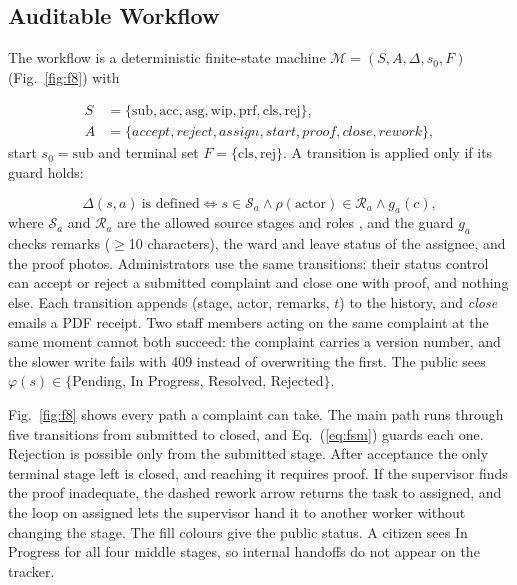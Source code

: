 \documentclass{ieeeaccess}
\begin{document}
\subsection{Auditable Workflow}\label{sec:wf}

The workflow is a deterministic finite-state machine $\mathcal{M}=(S,A,\Delta,s_0,F)$ (Fig.~\ref{fig:f8}) with

\begin{align*}
S&=\{\mathrm{sub},\mathrm{acc},\mathrm{asg},\mathrm{wip},\mathrm{prf},\mathrm{cls},\mathrm{rej}\},\\
A&=\{\mathit{accept},\mathit{reject},\mathit{assign},\mathit{start},\mathit{proof},\mathit{close},\mathit{rework}\},
\end{align*}
\noindent start $s_0=\mathrm{sub}$ and terminal set $F=\{\mathrm{cls},\mathrm{rej}\}$. A transition is applied only if its guard holds:

\begin{equation}
\Delta(s,a)\ \text{is defined} \iff s\in\mathcal{S}_a \wedge \rho(\text{actor})\in\mathcal{R}_a \wedge g_a(c),
\label{eq:fsm}
\end{equation}
\noindent where $\mathcal{S}_a$ and $\mathcal{R}_a$ are the allowed source stages and roles \cite{b49}, and the guard $g_a$ checks remarks ($\ge$10 characters), the ward and leave status of the assignee, and the proof photos. Administrators use the same transitions: their status control can accept or reject a submitted complaint and close one with proof, and nothing else. Each transition appends (stage, actor, remarks, $t$) to the history, and \textit{close} emails a PDF receipt. Two staff members acting on the same complaint at the same moment cannot both succeed: the complaint carries a version number, and the slower write fails with 409 instead of overwriting the first. The public sees $\varphi(s)\in\{$Pending, In Progress, Resolved, Rejected$\}$.

Fig.~\ref{fig:f8} shows every path a complaint can take. The main path runs through five transitions from submitted to closed, and Eq.~(\ref{eq:fsm}) guards each one. Rejection is possible only from the submitted stage. After acceptance the only terminal stage left is closed, and reaching it requires proof. If the supervisor finds the proof inadequate, the dashed rework arrow returns the task to assigned, and the loop on assigned lets the supervisor hand it to another worker without changing the stage. The fill colours give the public status. A citizen sees In Progress for all four middle stages, so internal handoffs do not appear on the tracker.
\end{document}
